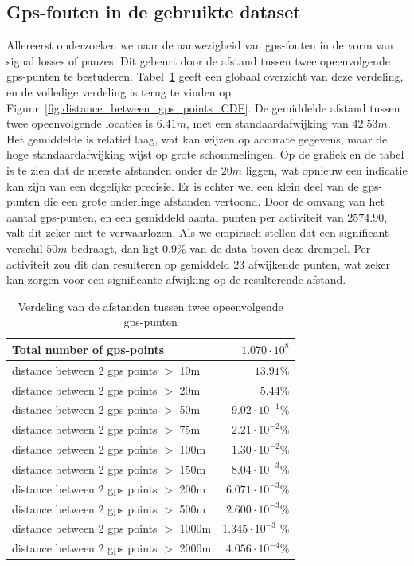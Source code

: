 \subsection{Gps-fouten in de gebruikte dataset}
Allereerst onderzoeken we naar de aanwezigheid van \ac{gps}-fouten in de vorm
van signal losses of pauzes. Dit gebeurt door de afstand tussen twee
opeenvolgende \ac{gps}-punten te bestuderen.
Tabel~\ref{tab:distance_between_gps_points_table} geeft een globaal overzicht
van deze verdeling, en de volledige verdeling is terug te vinden op
Figuur~\ref{fig:distance_between_gps_points_CDF}. De gemiddelde afstand tussen
twee opeenvolgende locaties is $6.41m$, met een standaardafwijking van
$42.53m$. Het gemiddelde is relatief laag, wat kan wijzen op accurate gegevens,
maar de hoge standaardafwijking wijst op grote schommelingen. Op de grafiek en
de tabel is te zien dat de meeste afstanden onder de $20m$ liggen, wat opnieuw
een indicatie kan zijn van een degelijke precisie. Er is echter wel een klein
deel van de \ac{gps}-punten die een grote onderlinge afstanden vertoond. Door
de omvang van het aantal \ac{gps}-punten, en een gemiddeld aantal punten per
activiteit van $2574.90$, valt dit zeker niet te verwaarlozen. Als we empirisch
stellen dat een significant verschil $50m$ bedraagt, dan ligt 0.9\% van de data
boven deze drempel. Per activiteit zou dit dan resulteren op gemiddeld $23$
afwijkende punten, wat zeker kan zorgen voor een significante afwijking op de
resulterende afstand.
\begin{table}[h]
    \centering
    \begin{tabular}{lr}
        \toprule
        \midrule
        Total number of gps-points              & $1.070 \cdot 10^8$        \\
        \hline
        distance between 2 gps points $>$ 10m   & $13.91\%$                 \\
        distance between 2 gps points $>$ 20m   & $5.44\%$                  \\
        distance between 2 gps points $>$ 50m   & $9.02 \cdot 10^{-1}\%$    \\
        distance between 2 gps points $>$ 75m   & $2.21 \cdot 10^{-2}\%$    \\
        distance between 2 gps points $>$ 100m  & $1.30 \cdot 10^{-2}\%$    \\
        distance between 2 gps points $>$ 150m  & $8.04 \cdot 10^{-3}\%$    \\
        distance between 2 gps points $>$ 200m  & $6.071 \cdot  10^{-3} \%$ \\
        distance between 2 gps points $>$ 500m  & $2.600 \cdot 10^{-3} \%$  \\
        distance between 2 gps points $>$ 1000m & $1.345 \cdot 10^{-3}$ \%  \\
        distance between 2 gps points $>$ 2000m & $4.056 \cdot 10^{-4} \%$  \\
        \midrule
        \bottomrule
    \end{tabular}
    \captionsetup{justification=centering}
    \caption{Verdeling van de afstanden tussen twee opeenvolgende gps-punten}\label{tab:distance_between_gps_points_table}
\end{table}
